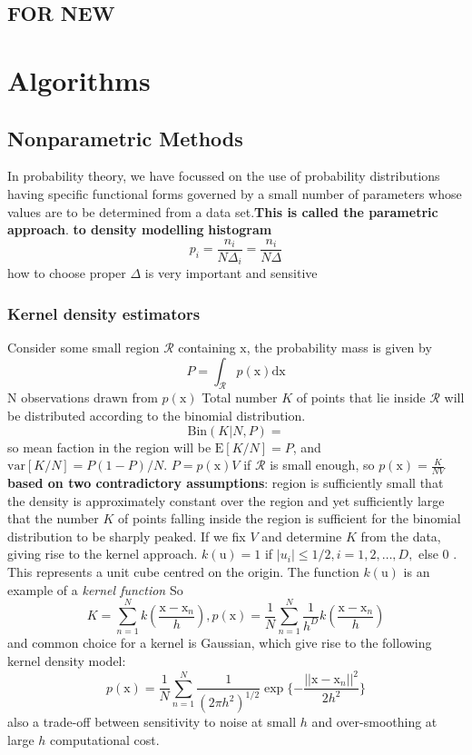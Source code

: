 \documentclass[a4paper]{book}
\begin{document}
\section{FOR NEW}


\chapter{Algorithms}
\section{Nonparametric Methods}
In probability theory, we have  focussed on the use of probability distributions
having specific functional forms governed by a small number of parameters whose
values are to be determined from a data set.\textbf{This is called the parametric approach}.
\textbf{to density modelling}\newline
\textbf{histogram}
$$p_i = \frac{n_i}{N\Delta_i}=\frac{n_i}{N\Delta}$$
how to choose proper $\Delta$ is very important and sensitive
\subsection{Kernel density estimators}
Consider some small region $\mathcal R$ containing $\mathrm x$, the probability mass is given by
$$P=\int_{\mathcal R}p(\mathrm x)\mathrm {dx}$$
N observations drawn from $p(\mathrm x)$ \newline
Total number $K$ of points that lie inside $\mathcal R$ will be distributed according to the binomial distribution.
$$\mathrm {Bin}(K|N,P) =$$
so mean faction in the region will be $\mathrm E[K/N] = P$, and $\mathrm {var}[K/N] = P(1-P)/N$.\newline
$P=p(\mathrm x)V$ if $\mathcal R$ is small enough, so $p(\mathrm x) = \frac{K}{NV}$\newline
\textbf{based on two contradictory assumptions}: region is sufficiently small that the density is approximately constant over the region and yet sufficiently large that the number $K$ of points falling inside the region is sufficient for the binomial distribution to be sharply peaked.\newline
If we fix $V$ and determine $K$ from the data,  giving rise to the kernel approach.
$k(\mathrm u) =1$ if $|u_i|\leq 1/2, i=1, 2, \dots, D, $ else $0$ .\newline
This represents a unit cube centred on the origin. The function $k(\mathrm u)$ is an example of a \emph{kernel function}\newline
So $$K = \sum_{n=1}^Nk(\frac{\mathrm x-\mathrm x_n}{h}), p(\mathrm x) = \frac1N\sum_{n=1}^N\frac1{h^D}k(\frac{\mathrm x-\mathrm x_n}{h})$$
and common choice for a kernel is Gaussian, which give rise to the following kernel density model:
$$p(\mathrm x) = \frac1N\sum_{n=1}^N\frac{1}{(2\pi h^2)^{1/2}}\exp\{-\frac{||\mathrm x-\mathrm x_n||^2}{2h^2}\}$$
also a trade-off between sensitivity to noise at small $h$ and over-smoothing at large $h$\newline
computational cost.
\end{document}
